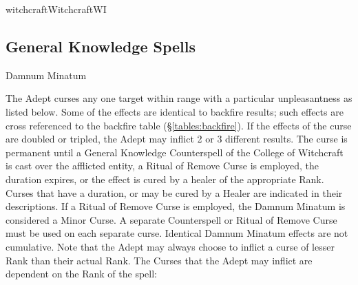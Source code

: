 \begin{college}[1.1]{witchcraft}{Witchcraft}{WI}
\subsection{General Knowledge Spells}

\begin{spell}[G-1]{Damnum Minatum}
\begin{effects}
The Adept curses any one target within range with a particular
unpleasantness as listed below. Some of the effects are identical to
backfire results; such effects are cross referenced to the backfire
table (\S\ref{tables:backfire}).  If the effects of the curse are
doubled or tripled, the Adept may inflict 2 or 3 different results.
The curse is permanent until a General Knowledge Counterspell of the
College of Witchcraft is cast over the afflicted entity, a Ritual of
Remove Curse is employed, the duration expires, or the effect is cured
by a healer of the appropriate Rank.  Curses that have a duration, or
may be cured by a Healer are indicated in their descriptions. If a
Ritual of Remove Curse is employed, the Damnum Minatum is considered a
Minor Curse.  A separate Counterspell or Ritual of Remove Curse must
be used on each separate curse.  Identical Damnum Minatum effects are
not cumulative.  Note that the Adept may always choose to inflict a
curse of lesser Rank than their actual Rank.  The Curses that the
Adept may inflict are dependent on the Rank of the spell:


\end{effects}
\end{spell}
\end{college}
